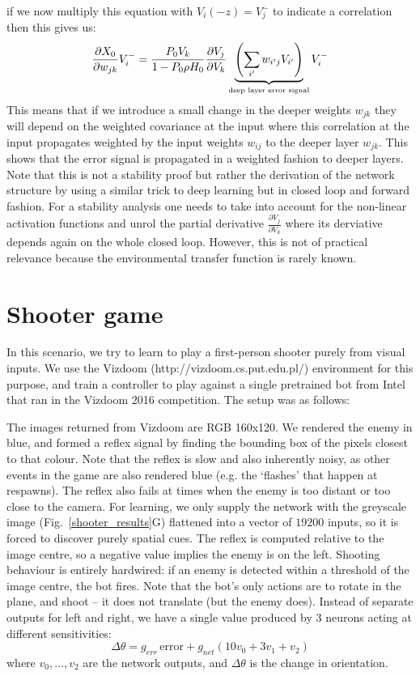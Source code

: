 \documentclass{article}
\begin{document}
  if we now multiply this equation with $V_i(-z)=V_j^-$ to indicate a correlation then this gives us:
\begin{equation}
    \frac{\partial X_0}{\partial w_{jk}} V_i^- =   
    \frac{P_0 V_k}{1-P_0 \rho H_0}
    \frac{\partial V_j}{\partial V_k}
    \underbrace{\left( \sum_{i^\prime} w_{i^\prime j} V_{i^\prime} \right)}_\textrm{\tiny deep layer error signal} V_i^-
\end{equation}
This means that if we introduce a small change in the deeper weights $w_{jk}$
they will depend on the weighted covariance at the input where this correlation
at the input propagates weighted by the input weights $w_{ij}$ to the deeper layer
$w_{jk}$. This shows that the error signal is propagated in a weighted
fashion to deeper layers. Note that this is not a stability proof but rather
the derivation of the network structure by using a similar trick to deep learning
but in closed loop and forward fashion. For a stability analysis one needs
to take into account for the non-linear activation functions and unrol the
partial derivative $\frac{\partial V_j}{\partial V_k}$ where its derviative depends
again on the whole closed loop. However, this is not of practical relevance
because the environmental transfer function is rarely known.
    
\section{Shooter game}
In this scenario, we try to learn to play a first-person shooter
purely from visual inputs. We use the Vizdoom
(http://vizdoom.cs.put.edu.pl/) environment for this purpose, and
train a controller to play against a single pretrained bot from Intel
that ran in the Vizdoom 2016 competition. The setup was as follows:

The images returned from Vizdoom are RGB 160x120. We rendered the
enemy in blue, and formed a reflex signal by finding the bounding box
of the pixels closest to that colour. Note that the reflex is slow and
also inherently noisy, as other events in the game are also rendered
blue (e.g. the ‘flashes’ that happen at respawns). The reflex also
fails at times when the enemy is too distant or too close to the
camera. For learning, we only supply the network with the greyscale
image (Fig.~\ref{shooter_results}G) flattened into a vector of $19200$
inputs, so it is forced to discover purely spatial cues. The reflex is
computed relative to the image centre, so a negative value implies the
enemy is on the left. Shooting behaviour is entirely hardwired: if an
enemy is detected within a threshold of the image centre, the bot
fires. Note that the bot's only actions are to rotate in the plane,
and shoot -- it does not translate (but the enemy does). Instead of
separate outputs for left and right, we have a single value produced
by 3 neurons acting at different sensitivities:
\begin{equation}
\Delta \theta = g_{err}\, \mathrm{error} + g_{net} \left( 10 v_0 + 3 v_1 + v_2 \right)
\end{equation}
where $v_0, \ldots, v_2$ are the network outputs, and $\Delta \theta$
is the change in orientation.
\end{document}
